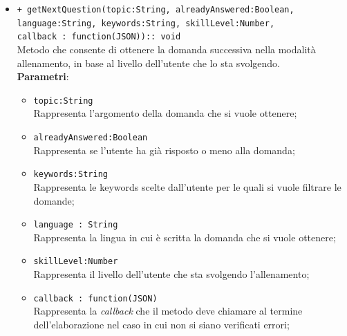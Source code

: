 \begin{itemize}
\begin{itemize}
			\item \texttt{+ getNextQuestion(topic:String, alreadyAnswered:Boolean, language:String, keywords:String, skillLevel:Number, \\callback : function(JSON)):: void} \\
			Metodo che consente di ottenere la domanda successiva nella modalità allenamento, in base al livello dell'utente che lo sta svolgendo. \\
			\textbf{Parametri}:
			\begin{itemize}
				\item \texttt{topic:String} \\
				Rappresenta l'argomento  della domanda che si vuole ottenere;	
				\item \texttt{alreadyAnswered:Boolean} \\
				Rappresenta se l'utente ha già risposto o meno alla domanda;
				\item \texttt{keywords:String} \\
				Rappresenta le keywords scelte dall'utente per le quali si vuole filtrare le domande;
				\item \texttt{language : String} \\
				Rappresenta la lingua in cui è scritta la domanda che si vuole ottenere;
				\item \texttt{skillLevel:Number} \\
				Rappresenta il livello dell'utente che sta svolgendo l'allenamento;
				\item \texttt{callback : function(JSON)} \\
				Rappresenta la \textit{callback} che il metodo deve chiamare al termine dell'elaborazione nel caso in cui non si siano verificati errori;
			\end{itemize}
		\end{itemize}
\end{itemize}